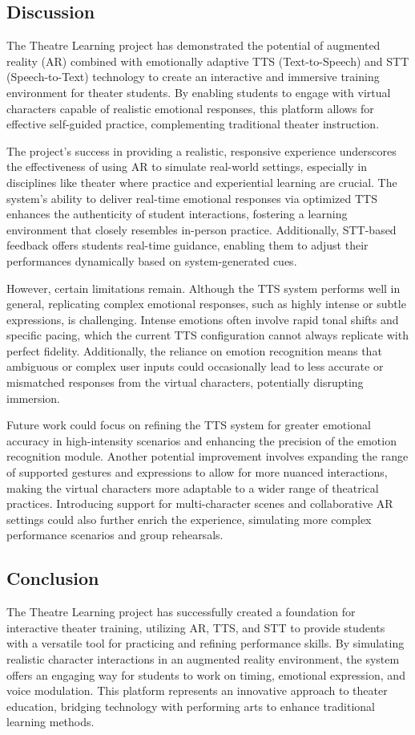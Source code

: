 \subsection{Discussion}
The Theatre Learning project has demonstrated the potential of augmented reality (AR) combined with emotionally adaptive TTS (Text-to-Speech) and STT (Speech-to-Text) technology to create an interactive and immersive training environment for theater students. By enabling students to engage with virtual characters capable of realistic emotional responses, this platform allows for effective self-guided practice, complementing traditional theater instruction.

The project’s success in providing a realistic, responsive experience underscores the effectiveness of using AR to simulate real-world settings, especially in disciplines like theater where practice and experiential learning are crucial. The system’s ability to deliver real-time emotional responses via optimized TTS enhances the authenticity of student interactions, fostering a learning environment that closely resembles in-person practice. Additionally, STT-based feedback offers students real-time guidance, enabling them to adjust their performances dynamically based on system-generated cues.

However, certain limitations remain. Although the TTS system performs well in general, replicating complex emotional responses, such as highly intense or subtle expressions, is challenging. Intense emotions often involve rapid tonal shifts and specific pacing, which the current TTS configuration cannot always replicate with perfect fidelity. Additionally, the reliance on emotion recognition means that ambiguous or complex user inputs could occasionally lead to less accurate or mismatched responses from the virtual characters, potentially disrupting immersion.

Future work could focus on refining the TTS system for greater emotional accuracy in high-intensity scenarios and enhancing the precision of the emotion recognition module. Another potential improvement involves expanding the range of supported gestures and expressions to allow for more nuanced interactions, making the virtual characters more adaptable to a wider range of theatrical practices. Introducing support for multi-character scenes and collaborative AR settings could also further enrich the experience, simulating more complex performance scenarios and group rehearsals.

\subsection{Conclusion}
The Theatre Learning project has successfully created a foundation for interactive theater training, utilizing AR, TTS, and STT to provide students with a versatile tool for practicing and refining performance skills. By simulating realistic character interactions in an augmented reality environment, the system offers an engaging way for students to work on timing, emotional expression, and voice modulation. This platform represents an innovative approach to theater education, bridging technology with performing arts to enhance traditional learning methods.

